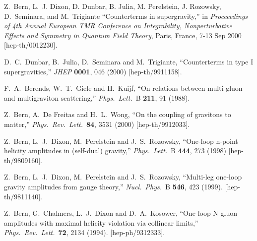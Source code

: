 \documentclass[12pt]{livrev}
\begin{document}
\begin{thebibliography}{99}
Z.~Bern, L.~J. Dixon, D. Dunbar, B. Julia, M. Perelstein, J. Rozowsky, 
D.~Seminara, and M.~Trigiante 
``Counterterms in supergravity,''
in 
{\it Proceeedings of 4th Annual European TMR Conference on Integrability,
 Nonperturbative Effects and Symmetry in Quantum Field Theory}, 
Paris, France, 7-13 Sep 2000 
[hep-th/0012230].

D.~C.~Dunbar, B.~Julia, D.~Seminara and M.~Trigiante,
``Counterterms in type I supergravities,''
{\it JHEP} {\bf 0001}, 046 (2000)
[hep-th/9911158].

F.~A.~Berends, W.~T.~Giele and H.~Kuijf,
``On relations between multi-gluon and multigraviton scattering,''
{\it Phys.\ Lett.}\ B {\bf 211}, 91 (1988).

Z.~Bern, A.~De Freitas and H.~L.~Wong,
``On the coupling of gravitons to matter,''
{\it Phys.\ Rev.\ Lett.}\  {\bf 84}, 3531 (2000)
[hep-th/9912033].

Z.~Bern, L.~J.~Dixon, M.~Perelstein and J.~S.~Rozowsky,
``One-loop n-point helicity amplitudes in (self-dual) gravity,''
{\it Phys.\ Lett.}\ B {\bf 444}, 273 (1998)
[hep-th/9809160].

Z.~Bern, L.~J.~Dixon, M.~Perelstein and J.~S.~Rozowsky,
``Multi-leg one-loop gravity amplitudes from gauge theory,''
{\it Nucl.\ Phys.}\ B {\bf 546}, 423 (1999).
[hep-th/9811140].

Z.~Bern, G.~Chalmers, L.~J.~Dixon and D.~A.~Kosower,
``One loop N gluon amplitudes with maximal helicity violation 
via collinear limits,''
{\it Phys.\ Rev.\ Lett.}\  {\bf 72}, 2134 (1994).
[hep-ph/9312333].


\end{thebibliography}
\end{document}

